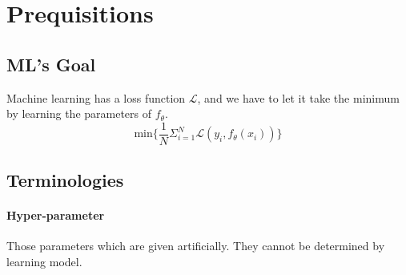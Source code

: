 \section{Prequisitions}
\subsection{ML's Goal}
Machine learning has a loss function $\mathcal{L}$, 
and we have to let it take the minimum by learning the parameters of $f_\theta$.
$$ 
\mathrm{min} \{\frac{1}{N} \Sigma_{i = 1}^N \mathcal{L} (y_i,f_\theta(x_i))\}
$$


\subsection{Terminologies}
\paragraph{\textbf{Hyper-parameter}} Those parameters which are given artificially.
They cannot be determined by learning model.
